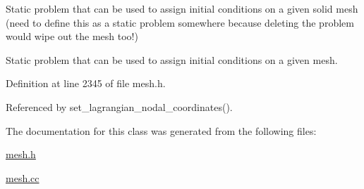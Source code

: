 Static problem that can be used to assign initial conditions on a given solid mesh (need to define this as a static problem somewhere because deleting the problem would wipe out the mesh too!) 

Static problem that can be used to assign initial conditions on a given mesh. 

Definition at line 2345 of file mesh.\+h.



Referenced by set\+\_\+lagrangian\+\_\+nodal\+\_\+coordinates().



The documentation for this class was generated from the following files\+:\begin{DoxyCompactItemize}
\item 
\hyperlink{mesh_8h}{mesh.\+h}\item 
\hyperlink{mesh_8cc}{mesh.\+cc}\end{DoxyCompactItemize}
